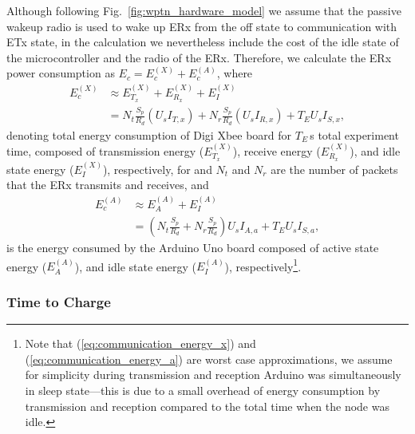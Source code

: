 \documentclass[11pt,draftclsnofoot,journal,onecolumn]{IEEEtran}
\begin{document}
Although following Fig.~\ref{fig:wptn_hardware_model} we assume that the passive wakeup radio is used to wake up ERx from the off state to communication with ETx state, in the calculation we nevertheless include the cost of the idle state of the microcontroller and the radio of the ERx. Therefore, we calculate the ERx power consumption as $E_{c}=E_{c}^{(X)}+E_{c}^{(A)}$, where
\begin{align}
E_{c}^{(X)} & \approx E_{T_x}^{(X)} + E_{R_x}^{(X)} + E_{I}^{(X)} \nonumber\\
& = N_{t}\frac{S_p}{R_d}(U_{s}I_{T,x}) + N_{r}\frac{S_p}{R_d}(U_{s}I_{R,x})+T_{E}U_{s}I_{S,x},
\label{eq:communication_energy_x}
\end{align}
denoting total energy consumption of Digi Xbee board for $T_{E}$\,s total experiment time, composed of transmission energy ($E_{T_x}^{(X)}$), receive energy ($E_{R_x}^{(X)}$), and idle state energy ($E_{I}^{(X)}$), respectively, for and $N_{t}$ and $N_{r}$ are the number of packets that the ERx transmits and receives, and
\begin{align}
E_{c}^{(A)} & \approx E_{A}^{(A)} + E_{I}^{(A)} \nonumber\\
& = \left(N_{t}\frac{S_p}{R_d}+N_{r}\frac{S_p}{R_d}\right)U_{s}I_{A,a}+T_{E}U_{s}I_{S,a},
\label{eq:communication_energy_a}
\end{align}
is the energy consumed by the Arduino Uno board composed of active state energy ($E_{A}^{(A)}$), and idle state energy ($E_{I}^{(A)}$), respectively\footnote{Note that (\ref{eq:communication_energy_x}) and (\ref{eq:communication_energy_a}) are worst case approximations, we assume for simplicity during transmission and reception Arduino was simultaneously in sleep state---this is due to a small overhead of energy consumption by transmission and reception compared to the total time when the node was idle.}.

\newcommand{\tOptB}{T^{\text{B}}_{\text{opt}}}
\newcommand{\tPesB}{T^{\text{B}}_{\text{pes}}}
\newcommand{\tOptBavg}{\overline{T}^{\text{B}}_{\text{opt}}}
\newcommand{\tPesBavg}{\overline{T}^{\text{B}}_{\text{pes}}}
\newcommand{\tStartB}{T^{\text{B}}_{\text{start}}}
\newcommand{\tOptP}{T^{\text{P}}_{\text{opt}}}
\newcommand{\tPesP}{T^{\text{P}}_{\text{pes}}}
\newcommand{\tOptPavg}{\overline{T}^{\text{P}}_{\text{opt}}}
\newcommand{\tPesPavg}{\overline{T}^{\text{P}}_{\text{pes}}}
\newcommand{\tStartP}{T^{\text{P}}_{\text{start}}}

\subsubsection{Time to Charge}
\label{sec:time_to_charge_metric}
\end{document}
